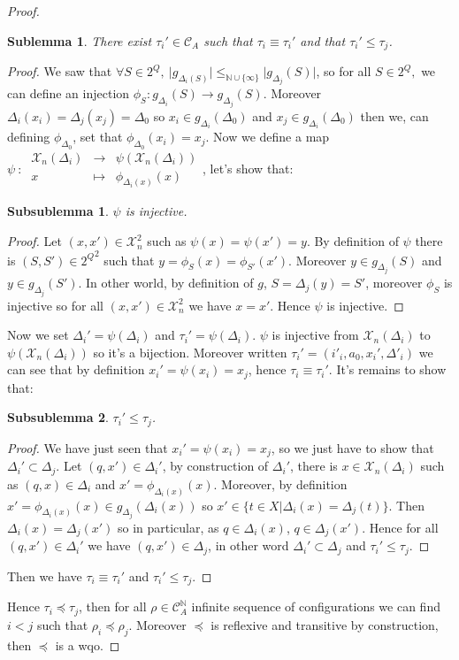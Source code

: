 \documentclass[a4paper,10pt]{report}
\newtheorem{slm}{Sublemma}[lm]
\newtheorem{sslm}{Subsublemma}[slm]
\newcommand{\dmap}[5]{
#1~:~\begin{array}{ccccc}
#2 &\to& #3 \\
#4  &\mapsto& #5
\end{array}}
\newcommand{\C}{\mathcal{C}_{A}}
\newcommand{\X}{\mathcal{X}_{n}}
\begin{document}
\begin {proof}
\begin{slm}
  There exist $\tau_i' \in \C$ such that $\tau_i \equiv \tau_i'$ and that  $\tau_i' \leq \tau_j$.
\end{slm}
\begin{proof}
We saw that $\forall S \in 2^Q,\ \lvert g_{\Delta_i(S)} \lvert \leq_{\mathbb N \cup \{\infty\}} \lvert g_{\Delta_j}(S) \lvert$, 
so for all $S \in 2^Q,$ we can define an injection $\phi_S: g_{\Delta_i}(S) \to g_{\Delta_j}(S)$. 
Moreover $\Delta_i(x_i)=\Delta_j(x_j)=\Delta_0$ so $x_i \in g_{\Delta_i}(\Delta_0)$ and $x_j \in g_{\Delta_i}(\Delta_0) $ then we, can defining $\phi_{\Delta_0}$, set that $\phi_{\Delta_0}(x_i)=x_j$.
Now we define a map $\dmap{\psi}{\X(\Delta_i)}{\psi(\X(\Delta_i))}{x}{\phi_{\Delta_i(x)}(x)}$, let's show that:
\begin{sslm}
  $\psi$ is injective.
\end{sslm}
\begin{proof}
Let $(x,x') \in \X^2$ such as $\psi(x)=\psi(x')=y$.
By definition of $\psi$ there is $(S,S')\in {2^Q}^2$ such that  $y=\phi_S(x)=\phi_{S'}(x')$. Moreover $y\in g_{\Delta_j}(S)$ and  $y\in g_{\Delta_j}(S')$. In other world, by definition of $g$,
$S=\Delta_j(y)=S'$, moreover $\phi_S$ is injective so for all $(x,x') \in \X^2 $ we have $ x=x'$.
Hence $\psi$ is injective.
\end{proof}
Now we set $\Delta_i'=\psi (\Delta_i)$ and $\tau_i'=\psi (\Delta_i)$.
$\psi$ is injective from $\X(\Delta_i)$ to $\psi(\X(\Delta_i))$ so it's a bijection.
Moreover written $ \tau_i'=(i'_i,a_0,x_i',\Delta'_i)$ we can see that by definition $ x_i'=\psi(x_i)=x_j$, hence $\tau_i \equiv \tau_i'$.
It's remains to show that:
\begin{sslm}
  $\tau_i' \leq \tau_j$.
\end{sslm}

\begin{proof}
  We have just seen that $ x_i'=\psi(x_i)=x_j$, so we just have to show that $\Delta_i' \subset \Delta_j$.
  Let $(q,x') \in \Delta_i'$, by construction of $\Delta_i'$, there is $x \in \X(\Delta_i)$ such as $(q,x) \in \Delta_i$ and $x'=\phi_{\Delta_i(x)}(x)$.
  Moreover, by definition $x'=\phi_{\Delta_i(x)}(x) \in g_{\Delta_j}(\Delta_i(x))$ so $ x' \in \{ t \in X | \Delta_i(x)=\Delta_j(t) \}$.
  Then $\Delta_i(x)=\Delta_j(x')$ so in particular, as $q \in \Delta_i(x)$, $q \in \Delta_j(x')$.
  Hence for all $(q,x') \in \Delta_i'$ we have $(q,x') \in \Delta_j$, in other word $\Delta_i' \subset \Delta_j$ and $\tau_i' \leq \tau_j$.
\end{proof}
Then we have $\tau_i \equiv \tau_i'$ and  $\tau_i' \leq \tau_j$.
\end{proof}	
Hence $\tau_i \preceq \tau_j$, then for all $\rho \in \C^{\mathbb N}$ infinite sequence of configurations we can find $i < j$ such that $\rho_i \preceq \rho_j$.
Moreover $\preceq$ is reflexive and transitive by construction, then $\preceq$ is a wqo.

\end{proof}
\end{document}
